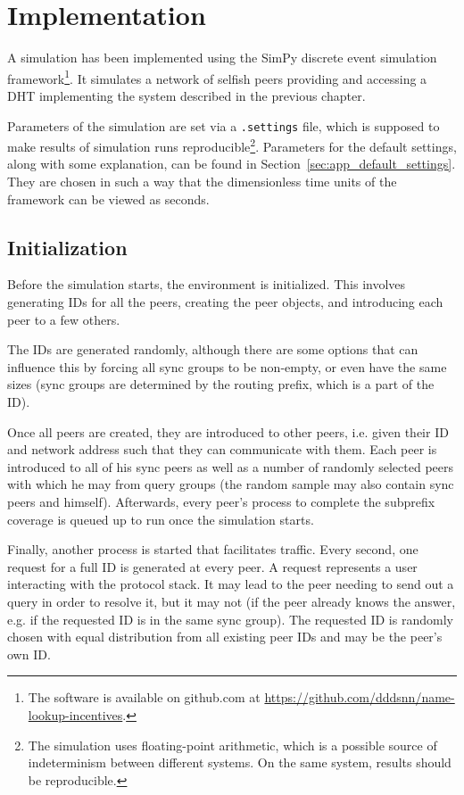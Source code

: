 \chapter{Implementation}
\label{chap:implementation}
A simulation has been implemented using the SimPy discrete event simulation
framework\footnote{The software is available on github.com at
\url{https://github.com/dddsnn/name-lookup-incentives}.}. It simulates a network
of selfish peers providing and accessing a DHT implementing the system described
in the previous chapter.

Parameters of the simulation are set via a \texttt{.settings} file, which is
supposed to make results of simulation runs reproducible\footnote{The simulation
uses floating-point arithmetic, which is a possible source of indeterminism
between different systems\cite{dawson2013determinism}. On the same system,
results should be reproducible.}. Parameters for the default settings, along
with some explanation, can be found in Section~\ref{sec:app_default_settings}.
They are chosen in such a way that the dimensionless time units of the
framework can be viewed as seconds.

\section{Initialization}
Before the simulation starts, the environment is initialized. This involves
generating IDs for all the peers, creating the peer objects, and introducing
each peer to a few others.

The IDs are generated randomly, although there are some options that can
influence this by forcing all sync groups to be non-empty, or even have the same
sizes (sync groups are determined by the routing prefix, which is a part of the
ID).

Once all peers are created, they are introduced to other peers, i.e. given their
ID and network address such that they can communicate with them. Each peer is
introduced to all of his sync peers as well as a number of randomly selected
peers with which he may from query groups (the random sample may also contain
sync peers and himself). Afterwards, every peer's process to complete the
subprefix coverage is queued up to run once the simulation starts.

Finally, another process is started that facilitates traffic. Every second, one
request for a full ID is generated at every peer. A request represents a user
interacting with the protocol stack. It may lead to the peer needing to send out
a query in order to resolve it, but it may not (if the peer already knows the
answer, e.g. if the requested ID is in the same sync group). The requested ID is
randomly chosen with equal distribution from all existing peer IDs and may be
the peer's own ID.

